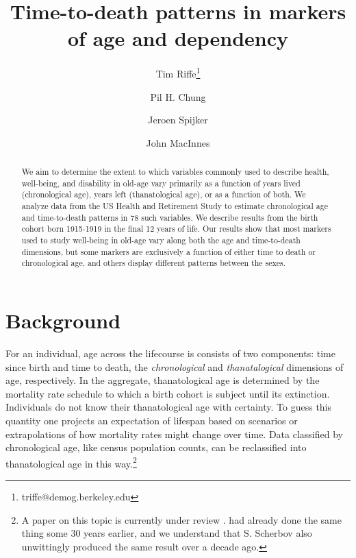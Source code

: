\documentclass[11pt,oneside,a4paper]{article}
\begin{document}
\title{Time-to-death patterns in markers of age and dependency}

\author[1]{Tim Riffe\thanks{triffe@demog.berkeley.edu}}
\author[1]{Pil H. Chung}
\author[2,3]{Jeroen Spijker}
\author[4]{John MacInnes}

\maketitle

\begin{abstract}
We aim to determine the extent to which variables commonly
used to describe health, well-being, and disability in old-age vary primarily
as a function of years lived (chronological age), years left (thanatological
age), or as a function of both.
We analyze data from the US Health and Retirement Study to estimate chronological age and time-to-death patterns in 78 such variables. We describe
results from the birth cohort born 1915-1919 in the final 12 years of life. Our results show
that most markers used to study well-being in old-age vary along both the age
and time-to-death dimensions, but some markers are exclusively a function of
either time to death or chronological age, and others display different patterns
between the sexes.
\end{abstract}

\section*{Background}

For an
individual, age across the lifecourse is consists of two components: time since
birth and time to death, the \textit{chronological} and \textit{thanatalogical}
dimensions of age, respectively. In the aggregate, thanatological age is determined
by the mortality rate schedule to which a birth cohort is subject until its
extinction. Individuals do not know their thanatological age with certainty. To
guess this quantity one projects an expectation of lifespan based on scenarios
or extrapolations of how mortality rates might change over time. Data classified by chronological age, like census population counts, can be
reclassified into thanatological age in this way.\footnote{A paper on this topic
is currently under review \citep{riffe2014paaposter}. \citet{brouard1986structure, brouard1989mouvements} had already done the same thing some 30 years earlier, and we understand that
S. Scherbov also unwittingly produced the same result over a decade ago.}
\end{document}
